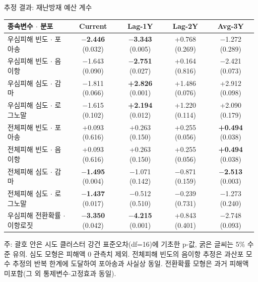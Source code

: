 \documentclass[aspectratio=169,10pt]{beamer}
\newcommand{\src}[1]{\par\vfill{\tiny\color{muted}#1}}
\begin{document}
\begin{frame}{추정 결과: 재난방재 예산 계수}
  \scriptsize
  \centering
  \begin{tabular}{@{}l cccc@{}}
    \toprule
    종속변수 $\cdot$ 분포 & Current & Lag-1Y & Lag-2Y & Avg-3Y \\
    \midrule
    \rowcolor{rowhl}
    우심피해 빈도 $\cdot$ 포아송 & \textbf{$-$2.446} (0.032) & \textbf{$-$3.343} (0.005) & +0.768 (0.269) & $-$1.272 (0.289) \\
    \rowcolor{rowhl}
    우심피해 빈도 $\cdot$ 음이항 & $-$1.643 (0.090) & \textbf{$-$2.751} (0.027) & +0.164 (0.816) & $-$2.421 (0.073) \\
    우심피해 심도 $\cdot$ 감마 & $-$1.811 (0.066) & \textbf{+2.826} (0.001) & +1.486 (0.076) & +2.912 (0.098) \\
    우심피해 심도 $\cdot$ 로그노말 & $-$1.615 (0.102) & \textbf{+2.194} (0.012) & +1.220 (0.114) & +2.090 (0.179) \\
    \midrule
    전체피해 빈도 $\cdot$ 포아송 & +0.093 (0.616) & +0.263 (0.150) & +0.255 (0.056) & \textbf{+0.494} (0.038) \\
    전체피해 빈도 $\cdot$ 음이항 & +0.093 (0.616) & +0.263 (0.150) & +0.255 (0.056) & \textbf{+0.494} (0.038) \\
    전체피해 심도 $\cdot$ 감마 & \textbf{$-$1.495} (0.004) & $-$1.071 (0.142) & $-$0.871 (0.159) & \textbf{$-$2.513} (0.003) \\
    전체피해 심도 $\cdot$ 로그노말 & \textbf{$-$1.437} (0.017) & $-$0.512 (0.510) & $-$0.239 (0.731) & $-$1.273 (0.240) \\
    \midrule
    \rowcolor{rowhl}
    우심피해 전환확률 $\cdot$ 이항로짓 & \textbf{$-$3.350} (0.042) & \textbf{$-$4.215} (0.001) & +0.843 (0.401) & $-$2.748 (0.093) \\
    \bottomrule
  \end{tabular}
  \src{주: 괄호 안은 시도 클러스터 강건 표준오차(df=16)에 기초한 p-값, 굵은 글씨는 5\% 수준 유의. 심도 모형은 피해액 0 관측치 제외. 전체피해 빈도의 음이항 추정은 과산포 모수 추정의 반복 한계에 도달하여 포아송과 사실상 동일. 전환확률 모형은 과거 피해액 미포함(그 외 통제변수$\cdot$고정효과 동일).}
\end{frame}
\end{document}
